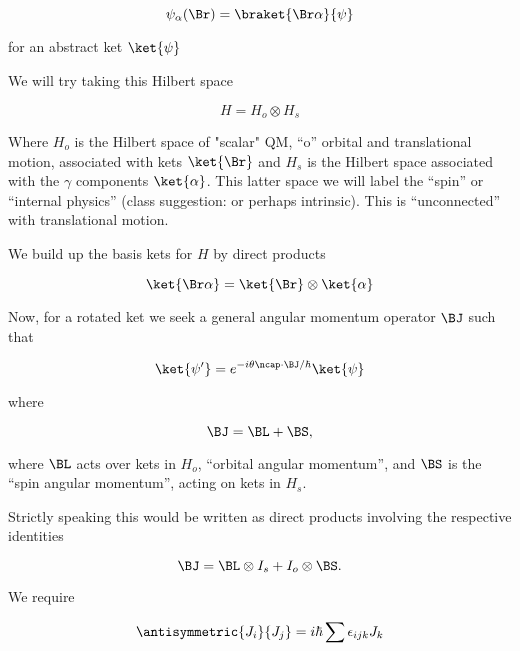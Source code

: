 \begin{equation}\label{eqn:qmTwoL13:90}
\psi_\alpha(\Br) = \braket{ \Br\alpha}{\psi}
\end{equation}

for an abstract ket $\ket{\psi}$

We will try taking this Hilbert space

\begin{equation}\label{eqn:qmTwoL13:110}
H = H_o \otimes H_s
\end{equation}

Where $H_o$ is the Hilbert space of "scalar" QM, ``o'' orbital and translational motion, associated with kets $\ket{\Br}$ and $H_s$ is the Hilbert space associated with the $\gamma$ components $\ket{\alpha}$.  This latter space we will label the ``spin'' or ``internal physics'' (class suggestion: or perhaps intrinsic).  This is ``unconnected'' with translational motion.

We build up the basis kets for $H$ by direct products

\begin{equation}\label{eqn:qmTwoL13:130}
\ket{\Br \alpha} = \ket{\Br} \otimes \ket{\alpha}
\end{equation}

Now, for a rotated ket we seek a general angular momentum operator $\BJ$ such that 

\begin{equation}\label{eqn:qmTwoL13:150}
\ket{\psi'} = e^{-i \theta \ncap \cdot \BJ/\hbar} \ket{\psi}
\end{equation}

where 

\begin{equation}\label{eqn:qmTwoL13:170}
\BJ = \BL + \BS,
\end{equation}

where $\BL$ acts over kets in $H_o$, ``orbital angular momentum'', and $\BS$ is the ``spin angular momentum'', acting on kets in $H_s$.

Strictly speaking this would be written as direct products involving the respective identities

\begin{equation}\label{eqn:qmTwoL13:190}
\BJ = \BL \otimes I_s + I_o \otimes \BS.
\end{equation}

We require

\begin{equation}\label{eqn:qmTwoL13:210}
\antisymmetric{J_i}{J_j} = i \hbar \sum \epsilon_{i j k} J_k
\end{equation}

